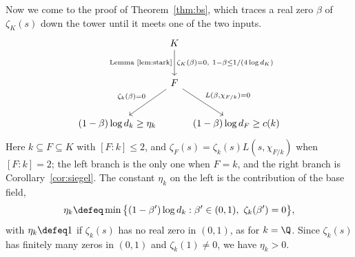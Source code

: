 \documentclass[11pt, reqno, twoside, letterpaper]{amsart}
\newcommand{\Kf}{K}
\begin{document}
Now we come to the proof of Theorem~\ref{thm:bs}, which traces a
real zero $\beta$ of $\zeta_\Kf(s)$ down the tower until it meets
one of the two inputs.
\[
\begin{tikzcd}[row sep=large, column sep=tiny]
& \Kf
  \arrow[d, "\text{Lemma~\ref{lem:stark}}"',
    "{\zeta_\Kf(\beta)=0,\ 1-\beta\le 1/(4\log d_\Kf)}"]
&\\
& F \arrow[dl, "{\zeta_k(\beta)=0}"']
    \arrow[dr, "{L(\beta,\chi_{F/k})=0}"]
  & \\
{(1-\beta)\log d_k\ge\eta_k}
& & {(1-\beta)\log d_F\ge c(k)}
\end{tikzcd}
\]
Here $k\subseteq F\subseteq\Kf$ with $[F:k]\le 2$, and
$\zeta_F(s)=\zeta_k(s)L(s,\chi_{F/k})$ when $[F:k]=2$; the left
branch is the only one when $F=k$, and the right branch is
Corollary~\ref{cor:siegel}. The constant $\eta_k$ on the left is
the contribution of the base field,
\[
\eta_k\defeq\min\big\{(1-\beta')\log d_k:\beta'\in(0,1),\
\zeta_k(\beta')=0\big\},
\]
with $\eta_k\defeq 1$ if $\zeta_k(s)$ has no real zero in $(0,1)$,
as for $k=\Q$. Since $\zeta_k(s)$ has finitely many zeros in $(0,1)$
and $\zeta_k(1)\ne 0$, we have $\eta_k>0$.
\end{document}

